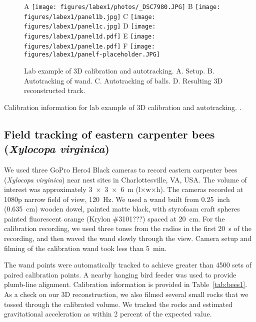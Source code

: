 \documentclass[fleqn,10pt]{wlpeerj}
\newcommand{\Xylocopavirginica}{\emph{Xylocopa virginica}}
\begin{document}
\begin{figure}
\caption{Lab example of 3D calibration and autotracking.  A. Setup.  B. Autotracking of wand.  C.  Autotracking of balls.  D.  Resulting 3D reconstructed track. }
\label{fig:labex1}
A \texttt{[image: figures/labex1/photos/\_DSC7980.JPG]}
B \texttt{[image: figures/labex1/panel1b.jpg]}
C \texttt{[image: figures/labex1/panel1c.jpg]}
D \texttt{[image: figures/labex1/panel1d.pdf]}
E \texttt{[image: figures/labex1/panel1e.pdf]}
F \texttt{[image: figures/labex1/panelf-placeholder.JPG]}
\end{figure}

\begin{table}
\caption{Calibration information for lab example of 3D calibration and autotracking. .}
\label{tab:labex2}
\begin{center}
\end{center}
\end{table}








\subsection*{Field tracking of eastern carpenter bees (\Xylocopavirginica)}
We used three GoPro Hero4 Black cameras to record eastern carpenter bees (\Xylocopavirginica) near nest sites in Charlottesville, VA, USA.  
The volume of interest was approximately \SI{3x3x6}{\meter} (l$\times$w$\times$h).  The cameras recorded at 1080p narrow field of view, \SI{120}{\hertz}.  We used a wand built from \SI{0.25}{inch} (\SI{0.635}{\centi\meter}) wooden dowel, painted matte black, with styrofoam craft spheres painted fluorescent orange (Krylon \#3101???) spaced at \SI{20}{\centi\meter}.  For the calibration recording, we used three tones from the radios in the first \SI{20}{\second} of the recording, and then waved the wand slowly through the view.  Camera setup and filming of the calibration wand took less than \SI{5}{\minute}.

The wand points were automatically tracked to achieve greater than 4500 sets of paired calibration points.  A nearby hanging bird feeder was used to provide plumb-line alignment.  Calibration information is provided in Table~\ref{tab:bees1}.  As a check on our 3D reconstruction, we also filmed several small rocks that we tossed through the calibrated volume.  We tracked the rocks and estimated gravitational acceleration as within 2 percent of the expected value.  
\end{document}
